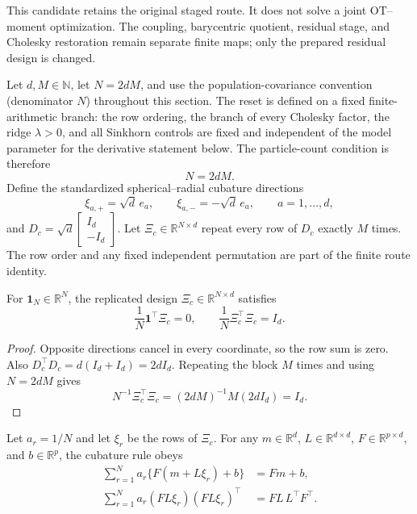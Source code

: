 This candidate retains the original staged route.  It does not solve a joint
OT--moment optimization.  The coupling, barycentric quotient, residual stage,
and Cholesky restoration remain separate finite maps; only the prepared
residual design is changed.

Let \(d,M\in\mathbb N\), let \(N=2dM\), and use the population-covariance
convention (denominator \(N\)) throughout this section.  The reset is defined
on a fixed finite-arithmetic branch: the row ordering, the branch of every
Cholesky factor, the ridge \(\lambda>0\), and all Sinkhorn controls are fixed
and independent of the model parameter for the derivative statement below.
The particle-count condition is therefore
\begin{equation}
\label{eq:bf-eot-cubature-particle-count}
 N=2dM.
\end{equation}
Define the standardized spherical--radial cubature directions
\begin{equation}
\label{eq:bf-eot-cubature-directions}
 \xi_{a,+}=\sqrt d\,e_a,\qquad
 \xi_{a,-}=-\sqrt d\,e_a,
 \qquad a=1,\ldots,d,
\end{equation}
and \(D_c=\sqrt d\begin{bmatrix}I_d\\-I_d\end{bmatrix}\).  Let
\(\Xi_c\in\mathbb R^{N\times d}\) repeat every row of \(D_c\) exactly \(M\)
times.  The row order and any fixed independent permutation are part of the
finite route identity.

\begin{proposition}
\label{prop:bf-eot-cubature-design-moments}
For \(\mathbf 1_N\in\mathbb R^N\), the replicated design
\(\Xi_c\in\mathbb R^{N\times d}\) satisfies
\begin{equation}
 \frac1N\mathbf1^\top\Xi_c=0,
 \qquad
 \frac1N\Xi_c^\top\Xi_c=I_d.
\end{equation}
\end{proposition}

\begin{proof}
Opposite directions cancel in every coordinate, so the row sum is zero.  Also
\(D_c^\top D_c=d(I_d+I_d)=2dI_d\).  Repeating the block \(M\) times and using
\(N=2dM\) gives
\[
 N^{-1}\Xi_c^\top\Xi_c=(2dM)^{-1}M(2dI_d)=I_d.
\]
\end{proof}

\begin{proposition}
\label{prop:bf-eot-cubature-affine-moments}
Let \(a_r=1/N\) and let \(\xi_r\) be the rows of \(\Xi_c\).  For any
  \(m\in\mathbb R^d\), \(L\in\mathbb R^{d\times d}\), \(F\in\mathbb R^{p\times
d}\), and \(b\in\mathbb R^p\), the cubature rule obeys
\begin{align}
 \sum_{r=1}^N a_r\{F(m+L\xi_r)+b\}&=Fm+b,\\
 \sum_{r=1}^N a_r (FL\xi_r)(FL\xi_r)^\top&=FL\,L^\top F^\top.
\end{align}
\end{proposition}


